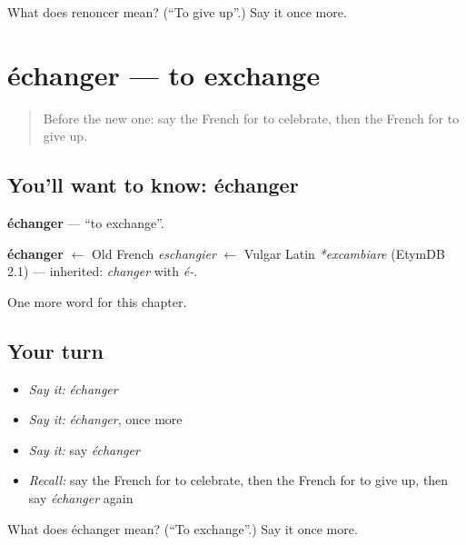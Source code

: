 \begin{tcolorbox}[breakable,colback=teal!4,colframe=teal!35!black,title={Before you move on}]
What does renoncer mean? (\textquotedblleft{}To give up\textquotedblright{}.) Say it once more.
\end{tcolorbox}
\section[échanger]{échanger — to exchange}

\label{lesson:FR-C183-echanger}



\begin{quote}
Before the new one: say the French for to celebrate, then the French for to give up.
\end{quote}

\subsection*{You'll want to know: échanger}
\textbf{échanger} — \textquotedblleft{}to exchange\textquotedblright{}.

\begin{cousinweb}
\textbf{échanger} $\leftarrow$ Old French \emph{eschangier} $\leftarrow$ Vulgar Latin \emph{*excambiare} (EtymDB 2.1) — inherited: \emph{changer} with \emph{é-}.
\end{cousinweb}

\begin{grammarlens}[title={What you've built}]
One more word for this chapter.
\end{grammarlens}

\subsection*{Your turn}
\begin{itemize}
\raggedright
  \item \emph{Say it:} \emph{échanger}
  \item \emph{Say it:} \emph{échanger}, once more
  \item \emph{Say it:} say \emph{échanger}
  \item \emph{Recall:} say the French for to celebrate, then the French for to give up, then say \emph{échanger} again
\end{itemize}

\begin{tcolorbox}[breakable,colback=teal!4,colframe=teal!35!black,title={Before you move on}]
What does échanger mean? (\textquotedblleft{}To exchange\textquotedblright{}.) Say it once more.
\end{tcolorbox}
